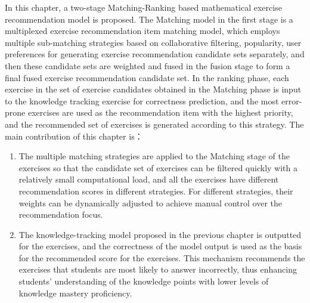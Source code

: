 In this chapter, a two-stage Matching-Ranking based mathematical exercise recommendation model is proposed. The Matching model in the first stage is a multiplexed exercise recommendation item matching model, which employs multiple sub-matching strategies based on collaborative filtering, popularity, user preferences for generating exercise recommendation candidate sets separately, and then these candidate sets are weighted and fused in the fusion stage to form a final fused exercise recommendation candidate set. In the ranking phase, each exercise in the set of exercise candidates obtained in the Matching phase is input to the knowledge tracking exercise for correctness prediction, and the most error-prone exercises are used as the recommendation item with the highest priority, and the recommended set of exercises is generated according to this strategy.
The main contribution of this chapter is：
\begin{enumerate}
  \item The multiple matching strategies are applied to the Matching stage of the exercises so that the candidate set of exercises can be filtered quickly with a relatively small computational load, and all the exercises have different recommendation scores in different strategies. For different strategies, their weights can be dynamically adjusted to achieve manual control over the recommendation focus.
  \item The knowledge-tracking model proposed in the previous chapter is outputted for the exercises, and the correctness of the model output is used as the basis for the recommended score for the exercises. This mechanism recommends the exercises that students are most likely to answer incorrectly, thus enhancing students' understanding of the knowledge points with lower levels of knowledge mastery proficiency.
\end{enumerate}